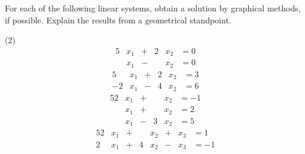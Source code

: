 \documentclass[../../../../Assignments]{subfiles}
\begin{document}
\begin{exercise}
    For each of the following linear systems, obtain a solution by graphical
    methods, if possible. Explain the results from a geometrical standpoint.
\end{exercise}

\begin{solution}
    \begin{tasks}(2)
        \task
            \begin{alignat*}{5}
                &x_1 &{}+{}& 2&x_2 &{}= 0 \\
                &x_1 &{}-{}&  &x_2 &{}= 0
            \end{alignat*}
        \task
            \begin{alignat*}{5}
                  &x_1 &{}+{}& 2&x_2 &{}= 3 \\
                -2&x_1 &{}-{}& 4&x_2 &{}= 6
            \end{alignat*}
        \task
            \begin{alignat*}{5}
                2&x_1 &{}+{}&  &x_2 &{}= -1 \\
                 &x_1 &{}+{}&  &x_2 &{}=  2 \\
                 &x_1 &{}-{}& 3&x_2 &{}=  5
            \end{alignat*}
        \task
            \begin{alignat*}{5}
                2&x_1 &{}+{}&  &x_2 &{}+{}& x_3 &{}=  1 \\
                2&x_1 &{}+{}& 4&x_2 &{}-{}& x_3 &{}= -1
            \end{alignat*}
    \end{tasks}
\end{solution}
\end{document}
